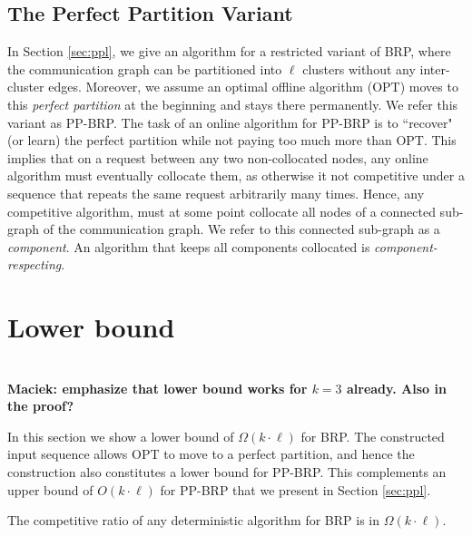 \documentclass[manuscript,screen=true]{acmart}
\newcommand{\OBRP}{BRP}
\newcommand{\PPOBRP}{PP-BRP}
\newcommand\maciek[1]{\color{brown}\textbf{\\ Maciek: #1}\color{black}}
\begin{document}
\subsection{The Perfect Partition Variant}	\label{sec:PP}
In Section \ref{sec:ppl},
we give an algorithm for a restricted variant of  \OBRP{},
where the communication graph can be partitioned into $\ell$ clusters without any inter-cluster edges.
Moreover, we assume an optimal offline algorithm (OPT) moves to this \emph{perfect partition}
at the beginning and stays there permanently.
We refer this variant as \PPOBRP{}.
The task of an online algorithm for \PPOBRP{} is to ``recover" (or learn) the perfect partition while not paying too much more than OPT.
This implies that on a request between any two non-collocated nodes,
any online algorithm must eventually collocate them,
as otherwise it not competitive under a sequence that repeats the same request arbitrarily many times.
Hence,
any competitive algorithm,
must at some point collocate all nodes of a  connected sub-graph of the communication graph.
We refer to this connected sub-graph as a \emph{component}.
An algorithm that  keeps all components collocated is \emph{component-respecting}.

\section{Lower bound} %
\label{sec:lowerbound}

\maciek{emphasize that lower bound works for $k=3$ already. Also in the proof?}

In this section we show a lower bound of $\Omega(k \cdot \ell)$ for \OBRP{}.
The constructed input sequence allows OPT to move to a perfect partition, and hence
the construction also constitutes a lower bound for \PPOBRP{}.
This complements an upper bound of $O(k \cdot \ell)$
for \PPOBRP{} that we present in Section \ref{sec:ppl}.

\begin{theorem}
	The competitive ratio of any deterministic algorithm for \OBRP{} is in $\Omega(k\cdot \ell)$.
\end{theorem}
\end{document}
